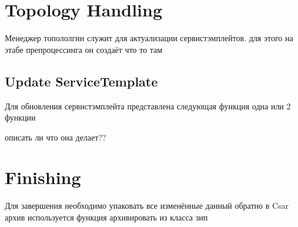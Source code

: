 \section{Topology Handling}
Менеджер топололгии служит для актуализации сервистэмплейтов. для этого на этабе препроцессинга он создаёт что то там
\fi
\subsection*{Update ServiceTemplate}
Для обновления сервистэмплейта представлена следующая функция 
одна или 2 функции

описать ли что она делает??

\fi
\section{Finishing}
Для завершения необходимо упаковать все изменённые данный обратно в Csar архив
используется функция архивировать из класса зип

\fi